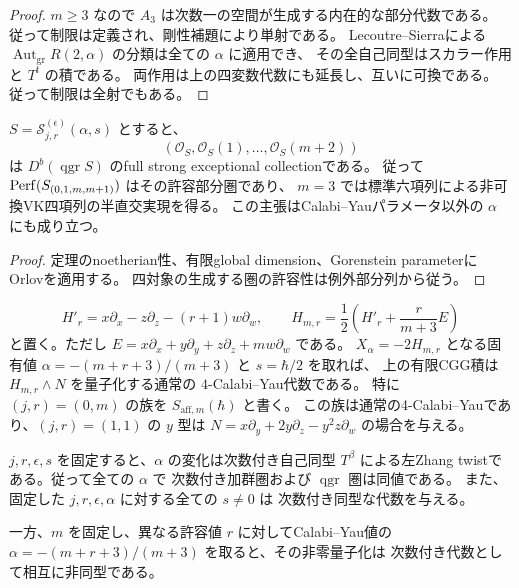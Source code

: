 \begin{proof}
$m\ge3$ なので $A_3$ は次数一の空間が生成する内在的な部分代数である。
従って制限は定義され、剛性補題により単射である。
Lecoutre--Sierra\cite[Theorem 4.10]{LecoutreSierra2019}による
$\operatorname{Aut}_{\mathrm{gr}}R(2,\alpha)$ の分類は全ての $\alpha$ に適用でき、
その全自己同型はスカラー作用と $T^t$ の積である。
両作用は上の四変数代数にも延長し、互いに可換である。
従って制限は全射でもある。
\end{proof}

\begin{corollary}[全アフィン族の標準例外列]
\label{cor:affine-exceptional-alljr-v34}
$S=\mathcal S_{j,r}^{(\epsilon)}(\alpha,s)$ とすると、
\[
 (\mathcal O_S,\mathcal O_S(1),\ldots,\mathcal O_S(m+2))
\]
は $D^b(\operatorname{qgr}S)$ のfull strong exceptional collectionである。
従って $\operatorname{Perf}(S_{(0,1,m,m+1)})$ はその許容部分圏であり、
$m=3$ では標準六項列による非可換VK四項列の半直交実現を得る。
この主張はCalabi--Yauパラメータ以外の $\alpha$ にも成り立つ。
\end{corollary}

\begin{proof}
定理のnoetherian性、有限global dimension、Gorenstein parameterに
Orlov\cite[Corollary 2.7]{Orlov2009}を適用する。
四対象の生成する圏の許容性は例外部分列から従う。
\end{proof}

\begin{corollary}[発散零のアフィン量子化]
\label{cor:affine-unimodular-cy-v34}
\[
 H'_r=x\partial_x-z\partial_z-(r+1)w\partial_w,
 \qquad H_{m,r}=\frac12\left(H'_r+\frac r{m+3}E\right)
\]
と置く。ただし $E=x\partial_x+y\partial_y+z\partial_z+mw\partial_w$ である。
$X_\alpha=-2H_{m,r}$ となる固有値
$\alpha=-(m+r+3)/(m+3)$ と $s=\hbar/2$ を取れば、
上の有限CGG積は $H_{m,r}\wedge N$ を量子化する通常の
$4$-Calabi--Yau代数である。
特に $(j,r)=(0,m)$ の族を $S_{\mathrm{aff},m}(\hbar)$ と書く。
この族は通常の4-Calabi--Yauであり、$(j,r)=(1,1)$ の $y$ 型は
$N=x\partial_y+2y\partial_z-y^2z\partial_w$ の場合を与える。
\end{corollary}

\begin{proposition}
\label{prop:affine-zhang-v34}
$j,r,\epsilon,s$ を固定すると、$\alpha$ の変化は次数付き自己同型
$T^\beta$ による左Zhang twistである。従って全ての $\alpha$ で
次数付き加群圏および $\operatorname{qgr}$ 圏は同値である。
また、固定した $j,r,\epsilon,\alpha$ に対する全ての $s\ne0$ は
次数付き同型な代数を与える。

一方、$m$ を固定し、異なる許容値 $r$ に対してCalabi--Yau値の
$\alpha=-(m+r+3)/(m+3)$ を取ると、その非零量子化は
次数付き代数として相互に非同型である。
\end{proposition}

